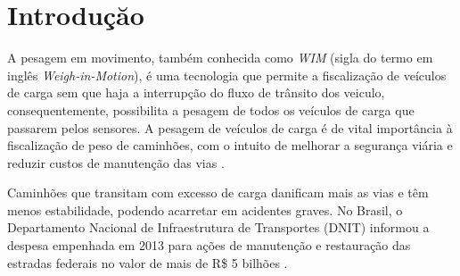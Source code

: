 \documentclass{ufscThesis}
\begin{document}
\capa  

%

\paginaresumo
\paginaabstract
\setcounter{page}{1}
\sumario

\setcounter{page}{1}
\chapter{Introduçăo}\label{introducao}

A pesagem em movimento, também conhecida como \textit{WIM} (sigla do termo em inglês \textit{Weigh-in-Motion}), é uma tecnologia que permite a fiscalização de veículos de carga sem que haja a interrupção do fluxo de trânsito dos veiculo, consequentemente, possibilita a pesagem de todos os veículos de carga que passarem pelos sensores. A pesagem de veículos de carga é de vital importância à fiscalização de peso de caminhões, com o intuito de melhorar a segurança viária e reduzir custos de manutenção das vias \cite{techreport:jacob2002wave}. 

Caminhões que transitam com excesso de carga danificam mais as vias e têm menos estabilidade, podendo acarretar em acidentes graves. No Brasil, o Departamento Nacional de Infraestrutura de Transportes (DNIT) informou a despesa empenhada em 2013 para ações de manutenção e restauração das estradas federais no valor de mais de R\$ 5 bilhões \cite{tech:relatorio-de-gestao-do-exercicio-de-2013}.
\end{document}
